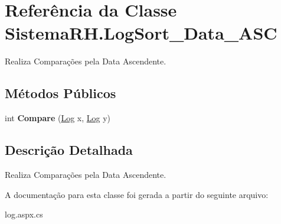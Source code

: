 \hypertarget{class_sistema_r_h_1_1_log_sort___data___a_s_c}{
\section{Referência da Classe SistemaRH.LogSort\_\-Data\_\-ASC}
\label{class_sistema_r_h_1_1_log_sort___data___a_s_c}
}


Realiza Comparações pela Data Ascendente.  


\subsection*{Métodos Públicos}
\begin{DoxyCompactItemize}
\item 
\hypertarget{class_sistema_r_h_1_1_log_sort___data___a_s_c_a31034f47d549aa22bad3421875a0e6c3}{
int {\bfseries Compare} (\hyperlink{class_sistema_r_h_1_1_log}{Log} x, \hyperlink{class_sistema_r_h_1_1_log}{Log} y)}
\label{class_sistema_r_h_1_1_log_sort___data___a_s_c_a31034f47d549aa22bad3421875a0e6c3}

\end{DoxyCompactItemize}


\subsection{Descrição Detalhada}
Realiza Comparações pela Data Ascendente. 

A documentação para esta classe foi gerada a partir do seguinte arquivo:\begin{DoxyCompactItemize}
\item 
log.aspx.cs\end{DoxyCompactItemize}
